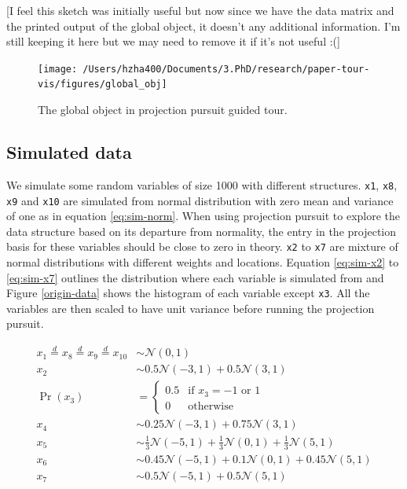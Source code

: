 \documentclass[12pt]{article}
\begin{document}
{[}I feel this sketch was initially useful but now since we have the
data matrix and the printed output of the global object, it doesn't any
additional information. I'm still keeping it here but we may need to
remove it if it's not useful :({]}

\begin{figure}
\texttt{[image: /Users/hzha400/Documents/3.PhD/research/paper-tour-vis/figures/global\_obj]} \caption{\label{glb-obj}The global object in projection pursuit guided tour.}\label{fig:glb-obj}
\end{figure}

\hypertarget{simulated-data}{%
\subsection{Simulated data}\label{simulated-data}}

We simulate some random variables of size 1000 with different
structures. \texttt{x1}, \texttt{x8}, \texttt{x9} and \texttt{x10} are
simulated from normal distribution with zero mean and variance of one as
in equation \ref{eq:sim-norm}. When using projection pursuit to explore
the data structure based on its departure from normality, the entry in
the projection basis for these variables should be close to zero in
theory. \texttt{x2} to \texttt{x7} are mixture of normal distributions
with different weights and locations. Equation \ref{eq:sim-x2} to
\ref{eq:sim-x7} outlines the distribution where each variable is
simulated from and Figure \ref{origin-data} shows the histogram of each
variable except \texttt{x3}. All the variables are then scaled to have
unit variance before running the projection pursuit.

\begin{align}
x_1 \overset{d}{=} x_8 \overset{d}{=} x_9 \overset{d}{=} x_{10}& \sim \mathcal{N}(0, 1) \label{eq:sim-norm} \\
x_2 &\sim 0.5 \mathcal{N}(-3, 1) + 0.5 \mathcal{N}(3, 1)\label{eq:sim-x2}\\
\Pr(x_3) &= 
\begin{cases}
0.5 & \text{if $x_3 = -1$ or $1$}\\
0 & \text{otherwise}
\end{cases}\label{eq:sim-x3}\\
x_4 &\sim 0.25 \mathcal{N}(-3, 1) + 0.75 \mathcal{N}(3, 1) \label{eq:sim-x4}\\
x_5 &\sim \frac{1}{3} \mathcal{N}(-5, 1) + \frac{1}{3} \mathcal{N}(0, 1) + \frac{1}{3} \mathcal{N}(5, 1)\label{eq:sim-x5}\\
x_6 &\sim 0.45 \mathcal{N}(-5, 1) + 0.1 \mathcal{N}(0, 1) + 0.45 \mathcal{N}(5, 1)\label{eq:sim-x6}\\
x_7 &\sim 0.5 \mathcal{N}(-5, 1) + 0.5 \mathcal{N}(5, 1) 
\label{eq:sim-x7}
\end{align}
\end{document}
